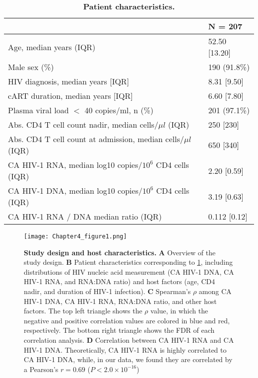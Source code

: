 \documentclass{book}
\begin{document}
\begin{refsection}
\begin{table}
  \begin{tabular}{ll}
    \hline
    & N = 207 \\
    \hline
    Age, median years (IQR)                                        & 52.50 [13.20] \\
    Male sex (\%)                                                  & 190 (91.8\%) \\
    HIV diagnosis, median years [IQR]                              & 8.31 [9.50] \\
    cART duration, median years [IQR]                              & 6.60 [7.80] \\
    Plasma viral load $<$ 40 copies/ml, n (\%)                     & 201 (97.1\%) \\
    Abs. CD4 T cell count nadir, median cells/$\mu l$ (IQR)        & 250 [230] \\
    Abs. CD4 T cell count at admission, median cells/$\mu l$ (IQR) & 650 [340] \\
    CA HIV-1 RNA, median log10 copies/$10^6$ CD4 cells (IQR)       & 2.20 [0.59] \\
    CA HIV-1 DNA, median log10 copies/$10^6$ CD4 cells (IQR)       & 3.19 [0.63] \\
    CA HIV-1 RNA / DNA median ratio (IQR)                          & 0.112 [0.12] \\
    \hline
  \end{tabular}
  \caption{\label{tab:cht4tab1}
    \textbf{Patient characteristics.}
  }
\end{table}

\begin{figure}
  \texttt{[image: Chapter4\_figure1.png]}
  \caption{
    \label{fig:cht4fig1} \textbf{Study design and host characteristics.}
    \textbf{A} Overview of the study design.
    \textbf{B} Patient characteristics corresponding to \ref{tab:cht4tab1}, including distributions of HIV nucleic acid measurement (CA HIV-1 DNA, CA HIV-1 RNA, and RNA:DNA ratio) and host factors (age, CD4 nadir, and duration of HIV-1 infection).
    \textbf{C} Spearman’s $\rho$ among CA HIV-1 DNA, CA HIV-1 RNA, RNA:DNA ratio, and other host factors. The top left triangle shows the $\rho$ value, in which the negative and positive correlation values are colored in blue and red, respectively. The bottom right triangle shows the FDR of each correlation analysis.
    \textbf{D} Correlation between CA HIV-1 RNA and CA HIV-1 DNA. Theoretically, CA HIV-1 RNA is highly correlated to CA HIV-1 DNA, while, in our data, we found they are correlated by a Pearson’s $r = 0.69$ ($P < 2.0 \times 10^{-16}$)
  }
\end{figure}


\end{refsection}
\end{document}
